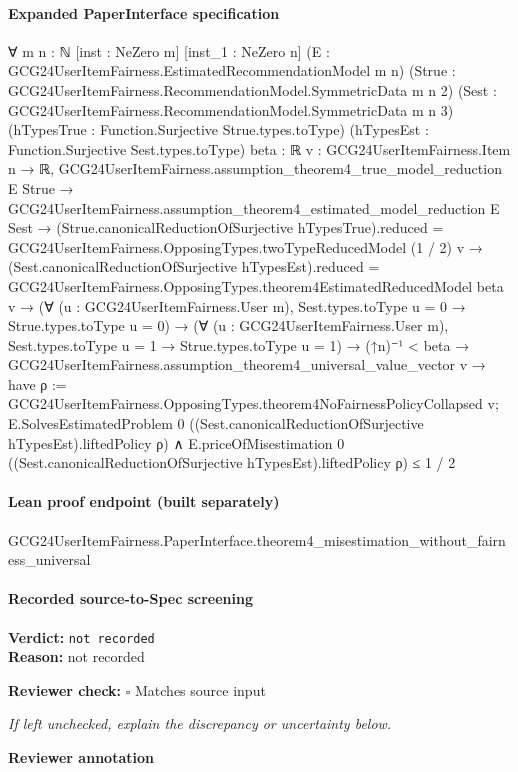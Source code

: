 \documentclass[10pt]{article}
\newcommand{\reviewerbox}{%
  \par\noindent\fbox{\parbox{0.96\linewidth}{\rule{0pt}{0.38in}}}\par
}
\newcommand{\reviewmatch}[1]{%
  \par\noindent\textbf{Reviewer check:} $\square$\; #1\par
  \noindent\emph{If left unchecked, explain the discrepancy or uncertainty below.}\par
}
\begin{document}
\paragraph{Expanded PaperInterface specification}
\begin{ReviewVerbatim}
∀ {m n : ℕ} [inst : NeZero m] [inst_1 : NeZero n] (E : GCG24UserItemFairness.EstimatedRecommendationModel m n)
  (Strue : GCG24UserItemFairness.RecommendationModel.SymmetricData m n 2)
  (Sest : GCG24UserItemFairness.RecommendationModel.SymmetricData m n 3)
  (hTypesTrue : Function.Surjective Strue.types.toType) (hTypesEst : Function.Surjective Sest.types.toType) {beta : ℝ}
  {v : GCG24UserItemFairness.Item n → ℝ},
  GCG24UserItemFairness.assumption_theorem4_true_model_reduction E Strue →
    GCG24UserItemFairness.assumption_theorem4_estimated_model_reduction E Sest →
      (Strue.canonicalReductionOfSurjective hTypesTrue).reduced =
          GCG24UserItemFairness.OpposingTypes.twoTypeReducedModel (1 / 2) v →
        (Sest.canonicalReductionOfSurjective hTypesEst).reduced =
            GCG24UserItemFairness.OpposingTypes.theorem4EstimatedReducedModel beta v →
          (∀ (u : GCG24UserItemFairness.User m), Sest.types.toType u = 0 → Strue.types.toType u = 0) →
            (∀ (u : GCG24UserItemFairness.User m), Sest.types.toType u = 1 → Strue.types.toType u = 1) →
              (↑n)⁻¹ < beta →
                GCG24UserItemFairness.assumption_theorem4_universal_value_vector v →
                  have ρ := GCG24UserItemFairness.OpposingTypes.theorem4NoFairnessPolicyCollapsed v;
                  E.SolvesEstimatedProblem 0 ((Sest.canonicalReductionOfSurjective hTypesEst).liftedPolicy ρ) ∧
                    E.priceOfMisestimation 0 ((Sest.canonicalReductionOfSurjective hTypesEst).liftedPolicy ρ) ≤ 1 / 2
\end{ReviewVerbatim}

\paragraph{Lean proof endpoint (built separately)}\begin{ReviewVerbatim}
GCG24UserItemFairness.PaperInterface.theorem4_misestimation_without_fairness_universal
\end{ReviewVerbatim}

\paragraph{Recorded source-to-Spec screening}
\textbf{Verdict:} \texttt{not recorded}
\\
\textbf{Reason:} not recorded
\reviewmatch{Matches source input}
\noindent\textbf{Reviewer annotation}\par
\reviewerbox
\clearpage
\hypertarget{source-claim-3691478eb60ec56f}{}
\end{document}
